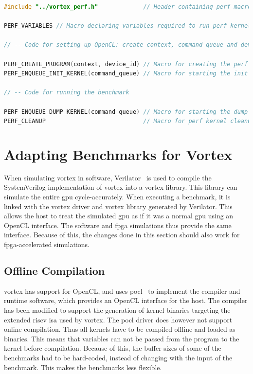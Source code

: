 \begin{lstlisting}[language=C, caption=Example of using the perf macros to create and use the initialization and dump kernels, label={lst:macros}]
#include "../vortex_perf.h"             // Header containing perf macros

PERF_VARIABLES // Macro declaring variables required to run perf kernels

// -- Code for setting up OpenCL: create context, command-queue and device

PERF_CREATE_PROGRAM(context, device_id) // Macro for creating the perf kernels
PERF_ENQUEUE_INIT_KERNEL(command_queue) // Macro for starting the init kernel

// -- Code for running the benchmark

PERF_ENQUEUE_DUMP_KERNEL(command_queue) // Macro for starting the dump kernel
PERF_CLEANUP                            // Macro for perf kernel cleanup 
\end{lstlisting}

\section{Adapting Benchmarks for Vortex}

When simulating \Gls{vortex} in software, Verilator~\cite{verilator} is used to compile the SystemVerilog implementation of \Gls{vortex} into a vortex library. This library can simulate the entire \acrshort{gpu} cycle-accurately. When executing a benchmark, it is linked with the \Gls{vortex} driver and \Gls{vortex} library generated by Verilator. This allows the host to treat the simulated \acrshort{gpu} as if it was a normal \acrshort{gpu} using an OpenCL interface. The software and \acrshort{fpga} simulations thus provide the same interface. Because of this, the changes done in this section should also work for \acrshort{fpga}-accelerated simulations.

\newpage
\subsection{Offline Compilation}

\Gls{vortex} has support for OpenCL, and uses \gls{pocl}~\cite{pocl} to implement the compiler and runtime software, which provides an OpenCL interface for the host. The compiler has been modified to support the generation of kernel binaries targeting the extended \Gls{riscv} \acrshort{isa} used by \Gls{vortex}. The \gls{pocl} driver does however not support online compilation. Thus all kernels have to be compiled offline and loaded as binaries. This means that variables can not be passed from the program to the kernel before compilation. Because of this, the buffer sizes of some of the benchmarks had to be hard-coded, instead of changing with the input of the benchmark. This makes the benchmarks less flexible.


